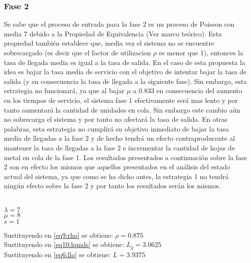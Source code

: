 \documentclass{article}
\begin{document}
\subsubsection{Fase 2}
Se sabe que el proceso de entrada para la fase 2 es un proceso de Poisson con media 7 
debido a la Propiedad de Equivalencia (Ver marco teórico). Esta propiedad también 
establece que, media vez el sistema no se encuentre sobrecargado (es decir que 
el factor de utilizacion $\rho$ es menor que 1), entonces la tasa de llegada media
es igual a la tasa de salida. En el caso de esta propuesta la idea es bajar 
la tasa media de servicio con el objetivo de intentar bajar la tasa de salida 
(y en consecuencia la tasa de llegada a la siguiente fase). Sin embargo, esta 
estrategia no funcionará, ya que al bajar $\mu$ a 0.833 en consecuencia del aumento 
en los tiempos de servicio, el sistema fase 1 efectivamente será mas lento y por 
tanto aumentará la cantidad de unidades en cola. Sin embargo este cambio aún 
no sobrecarga el sistema y por tanto no afectará la tasa de salida. En otras palabras, 
esta estrategia no cumplirá su objetivo inmediato de bajar la tasa media de llegadas
a la fase 2 y de hecho tendrá un efecto 
contraproducente al mantener la tasa de llegadas a la fase 2 e incrementar la 
cantidad de hojas de metal en cola de la fase 1.
Los resultados presentados a continuación sobre la fase 2 
son en efecto los mismos que aquellos presentados en el análisis del estado actual 
del sistema, ya que como se ha dicho antes, la estrategia 1 no tendrá 
ningún efecto sobre la 
fase 2 y por tanto los resultados serán los mismos.\\\\
\begin{Large}
$\lambda = 7$\\
$\mu = 8$\\
$s = 1$\\
\end{Large}
Sustituyendo en \ref{eq9:rho} se obtiene: $\rho = 0.875$ \\
Sustituyendo en \ref{eq10:lqmds} se obtiene: $L_{q} = 3.0625$\\
Sustituyendo en \ref{eq6:llq} se obtiene: $L = 3.9375$
\end{document}
